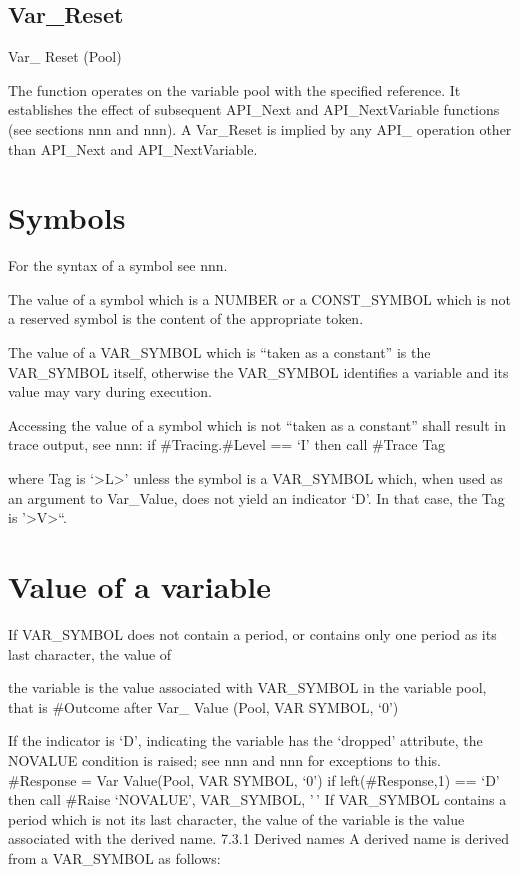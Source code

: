 \hypertarget{var_reset}{%
\subsection{Var\_Reset}\label{var_reset}}

Var\_ Reset (Pool)

The function operates on the variable pool with the specified reference.
It establishes the effect of subsequent API\_Next and API\_NextVariable
functions (see sections nnn and nnn). A Var\_Reset is implied by any
API\_ operation other than API\_Next and API\_NextVariable.

\hypertarget{symbols}{%
\section{Symbols}\label{symbols}}

For the syntax of a symbol see nnn.

The value of a symbol which is a NUMBER or a CONST\_SYMBOL which is not
a reserved symbol is the content of the appropriate token.

The value of a VAR\_SYMBOL which is ``taken as a constant'' is the
VAR\_SYMBOL itself, otherwise the VAR\_SYMBOL identifies a variable and
its value may vary during execution.

Accessing the value of a symbol which is not ``taken as a constant''
shall result in trace output, see nnn: if \#Tracing.\#Level == `I' then
call \#Trace Tag

where Tag is `\textgreater L\textgreater{}' unless the symbol is a
VAR\_SYMBOL which, when used as an argument to Var\_Value, does not
yield an indicator `D'. In that case, the Tag is
'\textgreater V\textgreater``.

\hypertarget{value-of-a-variable}{%
\section{Value of a variable}\label{value-of-a-variable}}

If VAR\_SYMBOL does not contain a period, or contains only one period as
its last character, the value of

the variable is the value associated with VAR\_SYMBOL in the variable
pool, that is \#Outcome after Var\_ Value (Pool, VAR SYMBOL, `0')

If the indicator is `D', indicating the variable has the `dropped'
attribute, the NOVALUE condition is raised; see nnn and nnn for
exceptions to this. \#Response = Var Value(Pool, VAR SYMBOL, `0') if
left(\#Response,1) == `D' then call \#Raise `NOVALUE', VAR\_SYMBOL, '\,'
If VAR\_SYMBOL contains a period which is not its last character, the
value of the variable is the value associated with the derived name.
7.3.1 Derived names A derived name is derived from a VAR\_SYMBOL as
follows:

